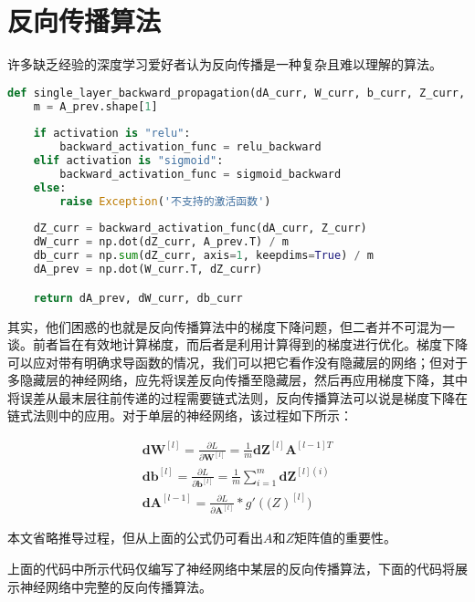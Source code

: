 \section{反向传播算法}

许多缺乏经验的深度学习爱好者认为反向传播是一种复杂且难以理解的算法。

\begin{lstlisting}[language=python, breaklines]
def single_layer_backward_propagation(dA_curr, W_curr, b_curr, Z_curr, A_prev, activation="relu"):
    m = A_prev.shape[1]
    
    if activation is "relu":
        backward_activation_func = relu_backward
    elif activation is "sigmoid":
        backward_activation_func = sigmoid_backward
    else:
        raise Exception('不支持的激活函数')
    
    dZ_curr = backward_activation_func(dA_curr, Z_curr)
    dW_curr = np.dot(dZ_curr, A_prev.T) / m
    db_curr = np.sum(dZ_curr, axis=1, keepdims=True) / m
    dA_prev = np.dot(W_curr.T, dZ_curr)

    return dA_prev, dW_curr, db_curr
\end{lstlisting}

其实，他们困惑的也就是反向传播算法中的梯度下降问题，但二者并不可混为一谈。前者旨在有效地计算梯度，而后者是利用计算得到的梯度进行优化。梯度下降可以应对带有明确求导函数的情况，我们可以把它看作没有隐藏层的网络；但对于多隐藏层的神经网络，应先将误差反向传播至隐藏层，然后再应用梯度下降，其中将误差从最末层往前传递的过程需要链式法则，反向传播算法可以说是梯度下降在链式法则中的应用。对于单层的神经网络，该过程如下所示：

\begin{align*}
    \mathbf{dW}^{[l]} = \frac{\partial L}{\partial \mathbf{W}^{[l]}} = \frac{1}{m}\mathbf{dZ}^{[l]}\mathbf{A}^{[l-1]T} \\
    \mathbf{db}^{[l]} = \frac{\partial L}{\partial \mathbf{b}^{[l]}} = \frac{1}{m}\sum_{i=1}^m\mathbf{dZ}^{[l](i)} \\
    \mathbf{dA}^{[l-1]}=\frac{\partial L}{\partial \mathbf{A}^{[l]}} * g'(\mathbf(Z)^{[l]})
\end{align*}

本文省略推导过程，但从上面的公式仍可看出$A$和$Z$矩阵值的重要性。

上面的代码中所示代码仅编写了神经网络中某层的反向传播算法，下面的代码将展示神经网络中完整的反向传播算法。

